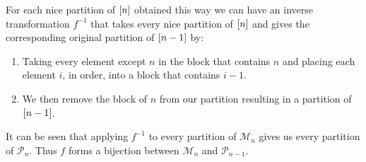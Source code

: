 \begin{chapterendexercises}
\begin{solution}
      For each nice partition of ${[{n}]}$ obtained this way we can have an
      inverse transformation $f^{-1}$ that takes every nice partition of
      ${[{n}]}$ and gives the corresponding original partition of 
      ${[{n - 1}]}$ by:
      \begin{enumerate}
        \item Taking every element except $n$ in the block that contains
          $n$ and placing each element $i$, in order, into a block that contains
          $i - 1$.
        \item We then remove the block of $n$ from our partition resulting in a
          partition of ${[{n - 1}]}$.
      \end{enumerate}

      It can be seen that applying $f^{-1}$ to every partition of $\mathcal{M}_n$ gives us
      every partition of $\mathcal{P}_n$. Thus $f$ forms a bijection between
      $\mathcal{M}_n$ and $\mathcal{P}_{n - 1}$.
    \end{solution}
\end{chapterendexercises}

